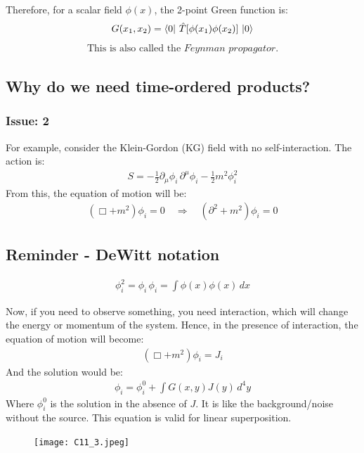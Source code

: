 \documentclass[14pt]{article} %
\begin{document}
{Therefore, for a scalar field $\phi(x)$, the 2-point Green function is:
\begin{align*}
G(x_1, x_2) = \bra{0} \,\hat{T}[\phi(x_1)\phi(x_2)]\, \ket{0}
\end{align*}
\begin{align*}
\boxed{\text{This is also called the }\textit{Feynman propagator.}}
\end{align*}

\subsection*{Why do we need time-ordered products?}
\subsubsection*{Issue: 2}
For example, consider the Klein-Gordon (KG) field with no self-interaction.  
The action is:
\begin{align*}
S = -\frac{1}{2} \partial_\mu \phi_i \,\partial^\mu \phi_i -\frac{1}{2} m^2 \phi_i^2
\end{align*}
From this, the equation of motion will be:
\begin{align*}
(\Box + m^2) \phi_i = 0
\quad \Rightarrow \quad
(\partial^2 + m^2) \phi_i = 0
\end{align*}
\begin{tcolorbox}
\subsection*{Reminder - DeWitt notation}
\begin{align*}
\phi_i^2 = \phi_i \, \phi_i = \int \phi(x) \phi(x) \, dx
\end{align*}
\end{tcolorbox}
Now, if you need to observe something, you need interaction, which will change the energy or momentum of the system. Hence, in the presence of interaction, the equation of motion will become:
\begin{align*}
(\Box + m^2)\phi_i = J_i
\end{align*}
And the solution would be:
\begin{align*}
\phi_i = \phi_i^0 + \int G(x,y) J(y) \, d^4 y
\end{align*}
Where $\phi_i^0$ is the solution in the absence of $J$. It is like the background/noise without the source. This equation is valid for linear superposition.
\begin{figure}[H]
    \centering
    \texttt{[image: C11\_3.jpeg]}
    \caption*{}
\end{figure}
\vspace{-1.5cm}
}
\end{document}
